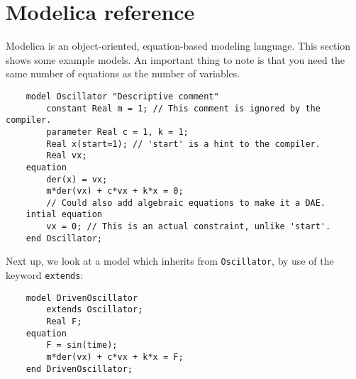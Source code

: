 \part{Modelica reference}
Modelica is an object-oriented, equation-based modeling language. This section shows some example models. An important thing to note is that you need the same number of equations as the number of variables.
\begin{verbatim}
    model Oscillator "Descriptive comment"
        constant Real m = 1; // This comment is ignored by the compiler.
        parameter Real c = 1, k = 1;
        Real x(start=1); // 'start' is a hint to the compiler.
        Real vx;
    equation
        der(x) = vx;
        m*der(vx) + c*vx + k*x = 0;
        // Could also add algebraic equations to make it a DAE.
    intial equation
        vx = 0; // This is an actual constraint, unlike 'start'.
    end Oscillator;
\end{verbatim}
Next up, we look at a model which inherits from \texttt{Oscillator}, by use of the keyword \texttt{extends}:
\begin{verbatim}
    model DrivenOscillator
        extends Oscillator;
        Real F;
    equation
        F = sin(time);
        m*der(vx) + c*vx + k*x = F;
    end DrivenOscillator;
\end{verbatim}
